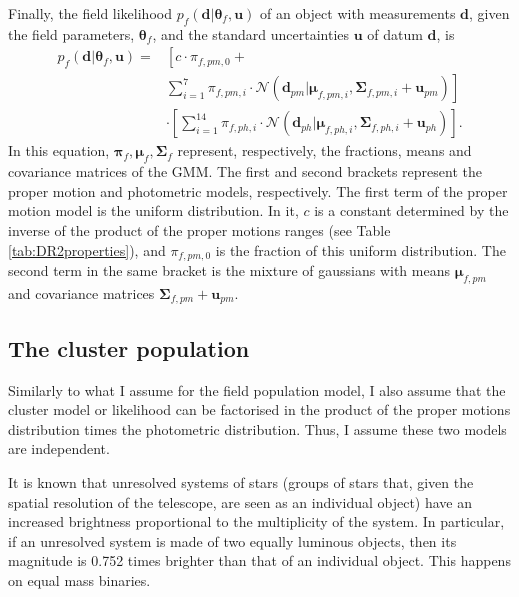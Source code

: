 Finally, the field likelihood $p_f(\mathbf{d}|\boldsymbol{\theta}_f,\mathbf{u})$ of an object with measurements $\mathbf{d}$, given the field parameters, $\boldsymbol{\theta}_f$,  and the standard uncertainties $\mathbf{u}$ of datum $\mathbf{d}$, is
\begin{align}
p_f(\mathbf{d}|\boldsymbol{\theta}_f,\mathbf{u})=&\left[ c\cdot\pi_{f,pm,0} + \nonumber \right. \\
&\left. \sum \limits_{i=1}^{7}\pi_{f,pm,i}\cdot \mathcal{N}(\mathbf{d}_{pm} | \boldsymbol{\mu}_{f,pm,i},\boldsymbol{\Sigma}_{f,pm,i}+\mathbf{u}_{pm})\right] \nonumber \\ 
&\cdot \left[ \sum \limits_{i=1}^{14}\pi_{f,ph,i}\cdot \mathcal{N}(\mathbf{d}_{ph} | \boldsymbol{\mu}_{f,ph,i},\boldsymbol{\Sigma}_{f,ph,i}+\mathbf{u}_{ph})\right].
\label{eq:field}
\end{align}
In this equation, $\boldsymbol{\pi}_f,\boldsymbol{\mu}_f,\boldsymbol{\Sigma}_f$ represent, respectively, the fractions, means and covariance matrices of the GMM. The first and second brackets represent the proper motion and photometric models, respectively. The first term of the proper motion model is the uniform distribution. In it, $c$ is a constant determined by the inverse of the product of the proper motions ranges (see Table \ref{tab:DR2properties}), and $\pi_{f,pm,0}$ is the fraction of this uniform distribution. The second term in the same bracket is the mixture of gaussians with means $\boldsymbol{\mu}_{f,pm}$ and covariance matrices $\boldsymbol{\Sigma}_{f,pm} +\mathbf{u}_{pm}$. 


\subsection{The cluster population}
\label{subsect:cluster}
Similarly to what I assume for the field population model, I also assume that the cluster model or likelihood can be factorised in the product of the proper motions distribution times the photometric distribution. Thus, I assume these two models are independent. 

It is known that unresolved systems of stars (groups of stars that, given the spatial resolution of the telescope, are seen as an individual object) have an increased brightness proportional to the multiplicity of the system. In particular, if an unresolved system is made of two equally luminous objects, then its magnitude is 0.752 times brighter than that of an individual object. This happens on equal mass binaries.

